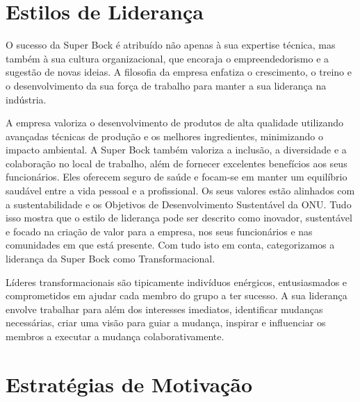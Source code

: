 \section{Estilos de Liderança}

O sucesso da Super Bock é atribuído não apenas à sua expertise técnica, mas também à sua cultura organizacional, que encoraja o empreendedorismo e a sugestão de novas ideias. A filosofia da empresa enfatiza o crescimento, o treino e o desenvolvimento da sua força de trabalho para manter a sua liderança na indústria.

A empresa valoriza o desenvolvimento de produtos de alta qualidade utilizando avançadas técnicas de produção e os melhores ingredientes, minimizando o impacto ambiental. A Super Bock também valoriza a inclusão, a diversidade e a colaboração no local de trabalho, além de fornecer excelentes benefícios aos seus funcionários. Eles oferecem seguro de saúde e focam-se em manter um equilíbrio saudável entre a vida pessoal e a profissional. Os seus valores estão alinhados com a sustentabilidade e os Objetivos de Desenvolvimento Sustentável da ONU. Tudo isso mostra que o estilo de liderança pode ser descrito como inovador, sustentável e focado na criação de valor para a empresa, nos seus funcionários e nas comunidades em que está presente. Com tudo isto em conta, categorizamos a liderança da Super Bock como Transformacional.

Líderes transformacionais são tipicamente indivíduos enérgicos, entusiasmados e comprometidos em ajudar cada membro do grupo a ter sucesso. A sua liderança envolve trabalhar para além dos interesses imediatos, identificar mudanças necessárias, criar uma visão para guiar a mudança, inspirar e influenciar os membros a executar a mudança colaborativamente.


\section{Estratégias de Motivação}
